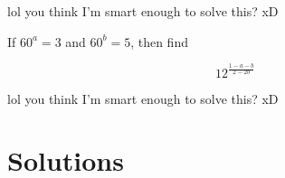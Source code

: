 \begin{solution}
  
lol you think I'm smart enough to solve this? xD
  
\end{solution}


\begin{question}

If $60^a = 3$ and $60^b = 5$, then find

$$
  12^{\frac{1-a-b}{2-2b}}
$$

\end{question}
    
\begin{solution}
  
lol you think I'm smart enough to solve this? xD
  
\end{solution}


\newpage
\section{Solutions}


\printsolutions